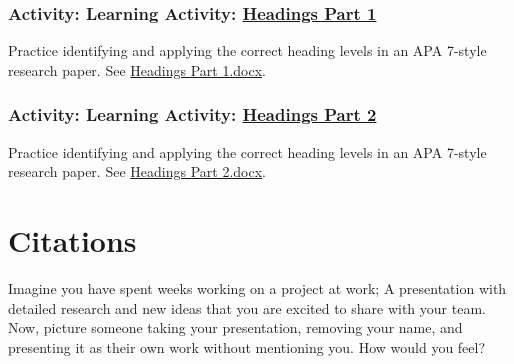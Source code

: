 \documentclass[
  letterpaper,
  DIV=11,
  numbers=noendperiod]{scrreprt}
\begin{document}
\subsection*{\texorpdfstring{Activity: Learning Activity:
\href{https://learn.twu.ca/mod/resource/view.php?id=1176289}{Headings
Part
1}}{Activity: Learning Activity: Headings Part 1}}\label{activity-learning-activity-headings-part-1}

Practice identifying and applying the correct heading levels in an APA
7-style research paper. See
\href{https://learn.twu.ca/pluginfile.php/1424895/mod_book/chapter/42915/Headings\%20Part\%201.docx}{Headings
Part 1.docx}.

\subsection*{\texorpdfstring{Activity: Learning Activity:
\href{https://learn.twu.ca/mod/resource/view.php?id=1176290}{Headings
Part
2}}{Activity: Learning Activity: Headings Part 2}}\label{activity-learning-activity-headings-part-2}

Practice identifying and applying the correct heading levels in an APA
7-style research paper. See
\href{https://learn.twu.ca/pluginfile.php/1424895/mod_book/chapter/42915/Headings\%20Part\%202.docx}{Headings
Part 2.docx}.


\chapter*{}\label{section-11}

\markboth{}{}


\chapter*{Citations}\label{citations}


Imagine you have spent weeks working on a project at work; A
presentation with detailed research and new ideas that you are excited
to share with your team. Now, picture someone taking your presentation,
removing your name, and presenting it as their own work without
mentioning you. How would you feel?
\end{document}
